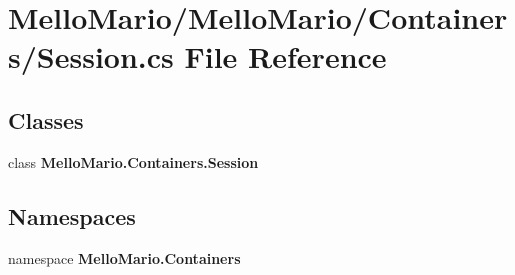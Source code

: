 \section{Mello\+Mario/\+Mello\+Mario/\+Containers/\+Session.cs File Reference}
\label{Session_8cs}
\subsection*{Classes}
\begin{DoxyCompactItemize}
\item 
class \textbf{ Mello\+Mario.\+Containers.\+Session}
\end{DoxyCompactItemize}
\subsection*{Namespaces}
\begin{DoxyCompactItemize}
\item 
namespace \textbf{ Mello\+Mario.\+Containers}
\end{DoxyCompactItemize}
